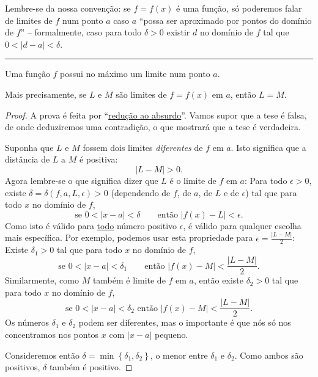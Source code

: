 Lembre-se da nossa convenção: se $f=f(x)$ é uma função, só poderemos falar de limites de $f$ num ponto $a$ caso $a$ ``possa ser aproximado por pontos do domínio de $f$'' -- formalmente, caso para todo $\delta>0$ existir $d$ no domínio de $f$ tal que $0<|d-a|<\delta$.

\hrule

\begin{theorem}
	Uma função $f$ possui no máximo um limite num ponto $a$.
	
	Mais precisamente, se $L$ e $M$ são limites de $f=f(x)$ em $a$, então $L=M$.
\end{theorem}
\begin{proof}
	A prova é feita por ``\href{https://pt.wikipedia.org/wiki/Reductio_ad_absurdum}{redução ao absurdo}''. Vamos supor que a tese é falsa, de onde deduziremos uma contradição, o que mostrará que a tese é verdadeira.
	
	Suponha que $L$ e $M$ fossem dois limites \emph{diferentes} de $f$ em $a$. Isto significa que a distância de $L$ a $M$ é positiva:
	\[|L-M|>0.\]
	Agora lembre-se o que significa dizer que $L$ é o limite de $f$ em $a$: Para todo $\epsilon>0$, existe $\delta=\delta(f,a,L,\epsilon)>0$ (dependendo de $f$, de $a$, de $L$ e de $\epsilon$) tal que para todo $x$ no domínio de $f$,
	\[\text{se }0<|x-a|<\delta\qquad\text{então }|f(x)-L|<\epsilon.\]
	Como isto é válido para \uline{todo} número positivo $\epsilon$, é válido para qualquer escolha mais específica. Por exemplo, podemos usar esta propriedade para $\epsilon=\frac{|L-M|}{2}$: Existe $\delta_1>0$ tal que para todo $x$ no domínio de $f$,
	\[\text{se }0<|x-a|<\delta_1\qquad\text{então }|f(x)-M|<\frac{|L-M|}{2}.\]
	Similarmente, como $M$ também é limite de $f$ em $a$, então existe $\delta_2>0$ tal que para todo $x$ no domínio de $f$,
	\[\text{se }0<|x-a|<\delta_2\text{ então }|f(x)-M|<\frac{|L-M|}{2}.\]
	Os números $\delta_1$ e $\delta_2$ podem ser diferentes, mas o importante é que nós só nos concentramos nos pontos $x$ com $|x-a|$ pequeno.
	
	Consideremos então $\delta=\min\left\{\delta_1,\delta_2\right\}$, o menor entre $\delta_1$ e $\delta_2$. Como ambos são positivos, $\delta$ também é positivo.
	

\end{proof}
